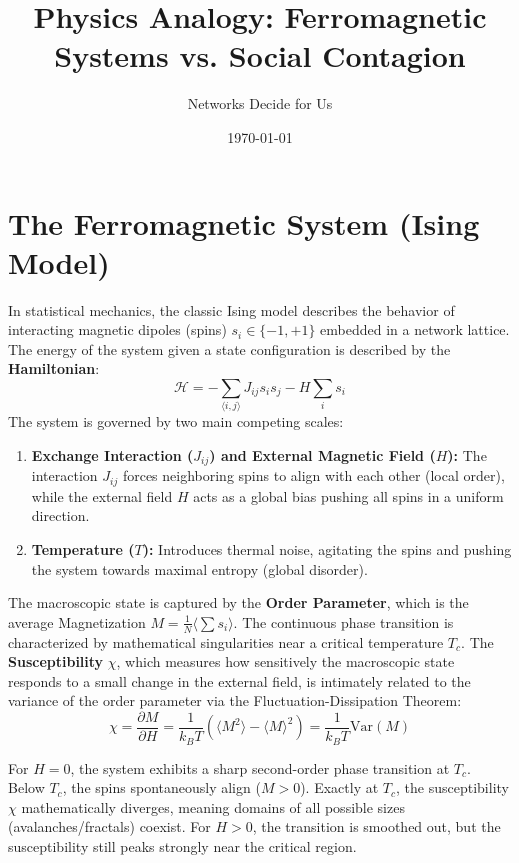 \documentclass[11pt]{article}
\title{Physics Analogy: Ferromagnetic Systems vs. Social Contagion}
\author{Networks Decide for Us}
\date{\today}
\begin{document}
\maketitle

\section{The Ferromagnetic System (Ising Model)}
In statistical mechanics, the classic Ising model describes the behavior of interacting magnetic dipoles (spins) $s_i \in \{-1, +1\}$ embedded in a network lattice. The energy of the system given a state configuration is described by the \textbf{Hamiltonian}:
\begin{equation}
    \mathcal{H} = - \sum_{\langle i,j \rangle} J_{ij} s_i s_j - H \sum_i s_i
\end{equation}
The system is governed by two main competing scales:
\begin{enumerate}
    \item \textbf{Exchange Interaction ($J_{ij}$) and External Magnetic Field ($H$):} The interaction $J_{ij}$ forces neighboring spins to align with each other (local order), while the external field $H$ acts as a global bias pushing all spins in a uniform direction.
    \item \textbf{Temperature ($T$):} Introduces thermal noise, agitating the spins and pushing the system towards maximal entropy (global disorder).
\end{enumerate}

The macroscopic state is captured by the \textbf{Order Parameter}, which is the average Magnetization $M = \frac{1}{N} \langle \sum s_i \rangle$. The continuous phase transition is characterized by mathematical singularities near a critical temperature $T_c$. The \textbf{Susceptibility} $\chi$, which measures how sensitively the macroscopic state responds to a small change in the external field, is intimately related to the variance of the order parameter via the Fluctuation-Dissipation Theorem:
\begin{equation}
    \chi = \frac{\partial M}{\partial H} = \frac{1}{k_B T} \left( \langle M^2 \rangle - \langle M \rangle^2 \right) = \frac{1}{k_B T} \text{Var}(M)
\end{equation}

For $H=0$, the system exhibits a sharp second-order phase transition at $T_c$. Below $T_c$, the spins spontaneously align ($M > 0$). Exactly at $T_c$, the susceptibility $\chi$ mathematically diverges, meaning domains of all possible sizes (avalanches/fractals) coexist. For $H>0$, the transition is smoothed out, but the susceptibility still peaks strongly near the critical region.
\end{document}
